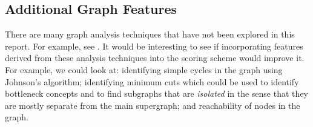 \documentclass[12pt]{article}
\theoremstyle{grammarstyle}
\begin{document}


\subsection{Additional Graph Features}
There are many graph analysis techniques that have not been explored in this report. For example, see \citep{algorithms_documentation}. It would be interesting to see if incorporating features derived from these analysis techniques into the scoring scheme would improve it. For example, we could look at: identifying simple cycles in the graph using Johnson's algorithm; identifying minimum cuts which could be used to identify bottleneck concepts and to find subgraphs that are \textit{isolated} in the sense that they are mostly separate from the main supergraph; and reachability of nodes in the graph.
\end{document}
